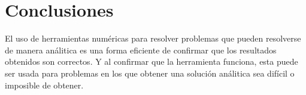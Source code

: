 \section{Conclusiones}

El uso de herramientas numéricas para resolver problemas que pueden resolverse de manera análitica es una forma eficiente de confirmar que los resultados obtenidos son correctos. Y al confirmar que la herramienta funciona, esta puede ser usada para problemas en los que obtener una solución análitica sea difícil o imposible de obtener.